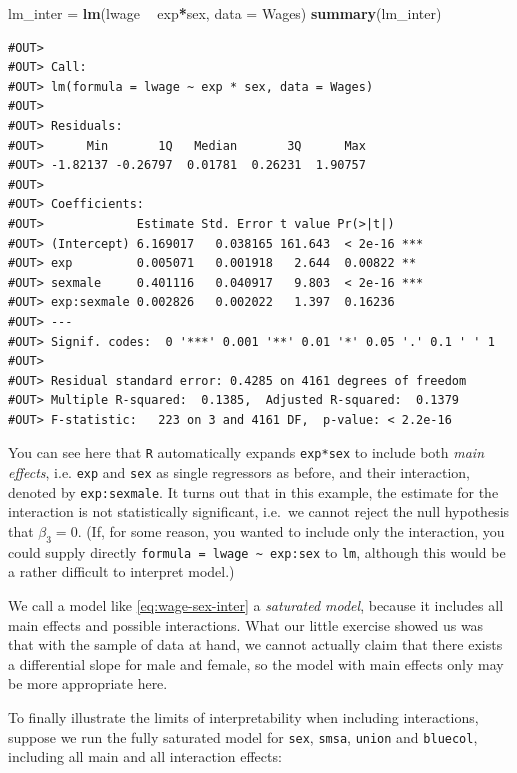 \documentclass[]{book}
\newenvironment{Shaded}{\begin{snugshade}}{\end{snugshade}}
\newcommand{\KeywordTok}[1]{\textcolor[rgb]{0.13,0.29,0.53}{\textbf{#1}}}
\newcommand{\DataTypeTok}[1]{\textcolor[rgb]{0.13,0.29,0.53}{#1}}
\newcommand{\StringTok}[1]{\textcolor[rgb]{0.31,0.60,0.02}{#1}}
\newcommand{\OperatorTok}[1]{\textcolor[rgb]{0.81,0.36,0.00}{\textbf{#1}}}
\newcommand{\NormalTok}[1]{#1}
\theoremstyle{definition}
\theoremstyle{definition}
\theoremstyle{definition}
\theoremstyle{remark}
\begin{document}
\begin{Shaded}
\begin{Highlighting}[]
\NormalTok{lm_inter =}\StringTok{ }\KeywordTok{lm}\NormalTok{(lwage }\OperatorTok{~}\StringTok{ }\NormalTok{exp}\OperatorTok{*}\NormalTok{sex, }\DataTypeTok{data =}\NormalTok{ Wages)}
\KeywordTok{summary}\NormalTok{(lm_inter)}
\end{Highlighting}
\end{Shaded}

\begin{verbatim}
#OUT> 
#OUT> Call:
#OUT> lm(formula = lwage ~ exp * sex, data = Wages)
#OUT> 
#OUT> Residuals:
#OUT>      Min       1Q   Median       3Q      Max 
#OUT> -1.82137 -0.26797  0.01781  0.26231  1.90757 
#OUT> 
#OUT> Coefficients:
#OUT>             Estimate Std. Error t value Pr(>|t|)    
#OUT> (Intercept) 6.169017   0.038165 161.643  < 2e-16 ***
#OUT> exp         0.005071   0.001918   2.644  0.00822 ** 
#OUT> sexmale     0.401116   0.040917   9.803  < 2e-16 ***
#OUT> exp:sexmale 0.002826   0.002022   1.397  0.16236    
#OUT> ---
#OUT> Signif. codes:  0 '***' 0.001 '**' 0.01 '*' 0.05 '.' 0.1 ' ' 1
#OUT> 
#OUT> Residual standard error: 0.4285 on 4161 degrees of freedom
#OUT> Multiple R-squared:  0.1385,  Adjusted R-squared:  0.1379 
#OUT> F-statistic:   223 on 3 and 4161 DF,  p-value: < 2.2e-16
\end{verbatim}

You can see here that \texttt{R} automatically expands \texttt{exp*sex}
to include both \emph{main effects}, i.e. \texttt{exp} and \texttt{sex}
as single regressors as before, and their interaction, denoted by
\texttt{exp:sexmale}. It turns out that in this example, the estimate
for the interaction is not statistically significant, i.e.~we cannot
reject the null hypothesis that \(\beta_3 = 0\). (If, for some reason,
you wanted to include only the interaction, you could supply directly
\texttt{formula\ =\ lwage\ \textasciitilde{}\ exp:sex} to \texttt{lm},
although this would be a rather difficult to interpret model.)

We call a model like \eqref{eq:wage-sex-inter} a \emph{saturated model},
because it includes all main effects and possible interactions. What our
little exercise showed us was that with the sample of data at hand, we
cannot actually claim that there exists a differential slope for male
and female, so the model with main effects only may be more appropriate
here.

To finally illustrate the limits of interpretability when including
interactions, suppose we run the fully saturated model for \texttt{sex},
\texttt{smsa}, \texttt{union} and \texttt{bluecol}, including all main
and all interaction effects:
\end{document}
